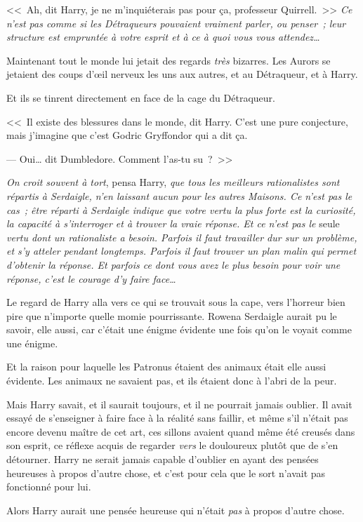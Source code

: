 <<~Ah, dit Harry, je ne m'inquiéterais pas pour ça, professeur Quirrell.~>> \emph{Ce n'est pas comme si les Détraqueurs pouvaient vraiment parler, ou penser~; leur structure est empruntée à votre esprit et à ce à quoi vous vous attendez…}

Maintenant tout le monde lui jetait des regards \emph{très} bizarres. Les Aurors se jetaient des coups d'œil nerveux les uns aux autres, et au Détraqueur, et à Harry.

Et ils se tinrent directement en face de la cage du Détraqueur.

<<~Il existe des blessures dans le monde, dit Harry. C'est une pure conjecture, mais j'imagine que c'est Godric Gryffondor qui a dit ça.

--- Oui… dit Dumbledore. Comment l'as-tu su~?~>>

\emph{On croit souvent à tort}, pensa Harry, \emph{que tous les meilleurs rationalistes sont répartis à Serdaigle, n'en laissant aucun pour les autres Maisons. Ce n'est pas le cas~; être réparti à Serdaigle indique que votre vertu la plus forte est la curiosité, la capacité à s'interroger et à trouver la vraie réponse. Et ce n'est pas le} seule \emph{vertu dont un rationaliste a besoin. Parfois il faut travailler dur sur un problème, et s'y atteler pendant longtemps. Parfois il faut trouver un plan malin qui permet d'obtenir la réponse. Et parfois ce dont vous avez le plus besoin pour voir une réponse, c'est le courage d'y faire face…}

Le regard de Harry alla vers ce qui se trouvait sous la cape, vers l'horreur bien pire que n'importe quelle momie pourrissante. Rowena Serdaigle aurait pu le savoir, elle aussi, car c'était une énigme évidente une fois qu'on le voyait comme une énigme.

Et la raison pour laquelle les Patronus étaient des animaux était elle aussi évidente. Les animaux ne savaient pas, et ils étaient donc à l'abri de la peur.

Mais Harry savait, et il saurait toujours, et il ne pourrait jamais oublier. Il avait essayé de s'enseigner à faire face à la réalité sans faillir, et même s'il n'était pas encore devenu maître de cet art, ces sillons avaient quand même été creusés dans son esprit, ce réflexe acquis de regarder \emph{vers} le douloureux plutôt que de s'en détourner. Harry ne serait jamais capable d'oublier en ayant des pensées heureuses à propos d'autre chose, et c'est pour cela que le sort n'avait pas fonctionné pour lui.

Alors Harry aurait une pensée heureuse qui n'était \emph{pas} à propos d'autre chose.

